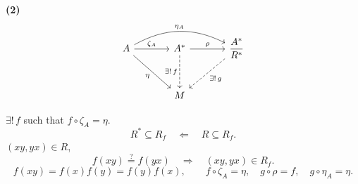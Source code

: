 \medskip
\noindent\textbf{(2)}
\[
\begin{tikzcd}[column sep=large, row sep=large]
A \arrow[r,"\zeta_A"] \arrow[dr,"\eta"']
  \arrow[rr,bend left=28,"\eta_A"]
  & A^* \arrow[r,"\rho"] \arrow[d,dashed,"{\exists!\,f}"']
  & \dfrac{A^*}{R^*} \arrow[dl,dashed,"{\exists!\,g}"] \\
& M &
\end{tikzcd}
\]

\noindent $\exists!\,f$ such that $f\circ\zeta_A=\eta$.
\[
R^*\subseteq R_f\quad\Longleftarrow\quad R\subseteq R_f.
\]
\noindent $(xy,yx)\in R$,
\[
f(xy)\overset{?}{=}f(yx)
\quad\Longrightarrow\quad (xy,yx)\in R_f.
\]
\[
f(xy)=f(x)f(y)=f(y)f(x),
\qquad f\circ\zeta_A=\eta,\quad g\circ\rho=f,\quad
 g\circ\eta_A=\eta.
\]
